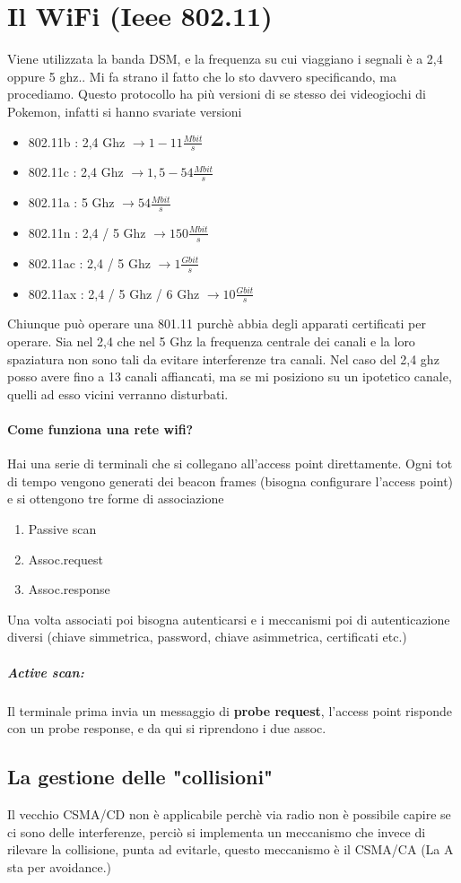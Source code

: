 \documentclass[12pt, a4paper, openany, twoside]{book}
\begin{document}
\section{Il WiFi (Ieee 802.11)}
Viene utilizzata la banda DSM, e la frequenza su cui viaggiano i segnali è a 
2,4 oppure 5 ghz.. Mi fa strano il fatto che lo sto davvero specificando, ma
procediamo. Questo protocollo ha più versioni di se stesso dei videogiochi di 
Pokemon, infatti si hanno svariate versioni
\begin{itemize}
	\item 802.11b : 2,4 Ghz $\to 1-11  \frac{Mbit}{s}$ 
	\item 802.11c : 2,4 Ghz $\to 1,5 - 54 \frac{Mbit}{s}$ 
	\item 802.11a : 5 Ghz $\to 54 \frac{Mbit}{s}$ 
	\item 802.11n : 2,4 / 5 Ghz $\to 150 \frac{Mbit}{s}$ 
	\item 802.11ac : 2,4 / 5 Ghz $\to 1 \frac{Gbit}{s}$ 
	\item 802.11ax : 2,4 / 5 Ghz / 6 Ghz $\to 10 \frac{Gbit}{s}$ 
\end{itemize} 
Chiunque può operare una 801.11 purchè abbia degli apparati certificati per 
operare. Sia nel 2,4 che nel 5 Ghz la frequenza centrale dei canali e la loro
spaziatura non sono tali da evitare interferenze tra canali. Nel caso del 
2,4 ghz posso avere fino a 13 canali affiancati, ma se mi posiziono su un 
ipotetico canale, quelli ad esso vicini verranno disturbati.
\paragraph{Come funziona una rete wifi?} Hai una serie di terminali che si 
collegano all'access point direttamente. Ogni tot di tempo vengono generati
dei beacon frames (bisogna configurare l'access point) e si ottengono tre forme
di associazione 
\begin{enumerate}
	\item Passive scan
	\item Assoc.request
	\item Assoc.response
\end{enumerate}
Una volta associati poi bisogna autenticarsi e i meccanismi poi di autenticazione 
diversi (chiave simmetrica, password, chiave asimmetrica, certificati etc.)
\subparagraph{Active scan:} Il terminale prima invia un messaggio di \textbf{probe
request}, l'access point risponde con un probe response, e da qui si riprendono
i due assoc. 
\subsection{La gestione delle "collisioni"}
Il vecchio CSMA/CD non è applicabile perchè via radio non è possibile capire se 
ci sono delle interferenze, perciò si implementa un meccanismo che invece di 
rilevare la collisione, punta ad evitarle, questo meccanismo è il CSMA/CA 
(La A sta per avoidance.)
\end{document}
